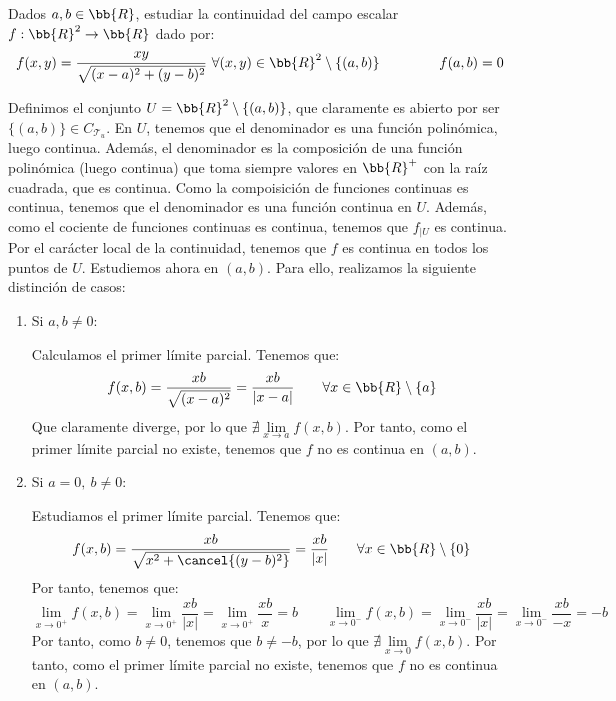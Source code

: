 \begin{ejercicio} Dados $a,b\in \bb{R}$, estudiar la continuidad del campo escalar $f:\bb{R}^2\to \bb{R}$ dado por:
\begin{equation*}
    f(x,y)=\frac{xy}{\sqrt{(x-a)^2 + (y-b)^2}}~\forall (x,y)\in \bb{R}^2\setminus \{(a,b)\} \hspace{1.5cm} f(a,b)=0
\end{equation*}

Definimos el conjunto $U=\bb{R}^2\setminus \{(a,b)\}$, que claramente es abierto por ser $\{(a,b)\}\in C_{\mathcal{T}_u}$.
En $U$, tenemos que el denominador es una función polinómica, luego continua. Además, el denominador es la composición de una función polinómica (luego continua)
que toma siempre valores en $\bb{R}^+$ con la raíz cuadrada, que es continua. Como la compoisición de funciones continuas es continua, tenemos que el denominador es una función continua en $U$.
Además, como el cociente de funciones continuas es continua, tenemos que $f_{\big | U}$ es continua.
Por el carácter local de la continuidad, tenemos que $f$ es continua en todos los puntos de $U$. Estudiemos ahora en $(a,b)$.
Para ello, realizamos la siguiente distinción de casos:
\begin{enumerate}
    \item Si $a,b\neq 0$:
    
    Calculamos el primer límite parcial. Tenemos que:
    \begin{equation*}
        f(x,b)=
        \frac{xb}{\sqrt{(x-a)^2}} =\frac{xb}{|x-a|} \qquad \forall x\in \bb{R}\setminus \{a\}
    \end{equation*}
    Que claramente diverge, por lo que $\nexists \lim\limits_{x\to a}f(x,b)$. Por tanto, como
    el primer límite parcial no existe, tenemos que $f$ no es continua en $(a,b)$.

    \item Si $a=0,~b\neq0$:
    
    Estudiamos el primer límite parcial. Tenemos que:
    \begin{equation*}
        f(x,b)= \frac{xb}{\sqrt{x^2 + \cancel{(y-b)^2}}} = \frac{xb}{|x|}
         \qquad \forall x\in \bb{R}\setminus \{0\}
    \end{equation*}
    Por tanto, tenemos que:
    \begin{equation*}
        \lim_{x\to 0^+}f(x,b)=\lim_{x\to 0^+}\frac{xb}{|x|} = \lim_{x\to 0^+}\frac{xb}{x} = b
        \qquad
        \lim_{x\to 0^-}f(x,b)=\lim_{x\to 0^-}\frac{xb}{|x|} = \lim_{x\to 0^-}\frac{xb}{-x} = -b
    \end{equation*}
    Por tanto, como $b\neq 0$, tenemos que $b\neq -b$, por lo que $\nexists \lim\limits_{x\to 0}f(x,b)$. Por tanto,
    como el primer límite parcial no existe, tenemos que $f$ no es continua en $(a,b)$.


\end{enumerate}
\end{ejercicio}
